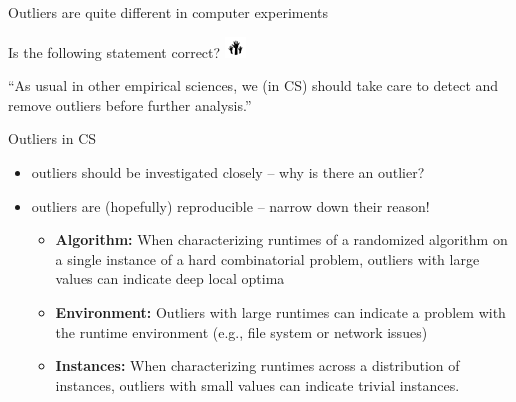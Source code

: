 \begin{frame}[c]{Outliers are quite different in computer experiments}

Is the following statement correct? \includegraphics[height=1.5em]{images/hands}

``As usual in other empirical sciences, we (in CS) should take care to \alert{detect and remove outliers} before further analysis.''

\pause
\bigskip

\begin{block}{Outliers in CS}
\begin{itemize}
	\item outliers should be investigated closely -- why is there an outlier?
	\item outliers are (hopefully) reproducible -- narrow down their reason!
	\pause
	\begin{itemize}
		\item \textbf{Algorithm:} When characterizing runtimes of a randomized algorithm on a single instance of a hard combinatorial problem, \alert{outliers with large values can indicate deep local optima}
		\pause
		\item \textbf{Environment:} Outliers with large runtimes can indicate a \alert{problem with the runtime environment} (e.g., file system or network issues)
		\pause
		\item \textbf{Instances:}  When characterizing runtimes across a distribution of instances, outliers with small values can indicate trivial instances.
	\end{itemize}
\end{itemize}
\end{block}

\end{frame}
